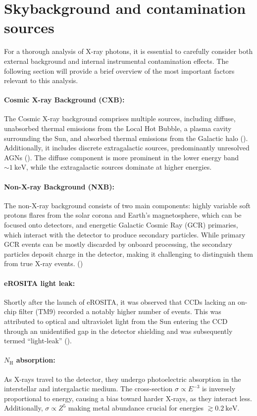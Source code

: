 %
\section{Skybackground and contamination sources}\label{sec:background}
For a thorough analysis of X-ray photons, it is essential to carefully consider both external background and internal instrumental contamination effects. The following section will provide a brief overview of the most important factors relevant to this analysis.
\paragraph*{Cosmic X-ray Background (CXB):} The Cosmic X-ray background comprises multiple sources, including diffuse, unabsorbed thermal emissions from the Local Hot Bubble, a plasma cavity surrounding the Sun, and absorbed thermal emissions from the Galactic halo (\cite{galeazzi2006xmm}). Additionally, it includes discrete extragalactic sources, predominantly unresolved AGNs  (\cite{brandt2005deep}). The diffuse component is more prominent in the lower energy band \(\sim\SI{1}{\kilo\electronvolt}\), while the extragalactic sources dominate at higher energies.
\paragraph*{Non-X-ray Background (NXB):} The non-X-ray background consists of two main components: highly variable soft protons flares from the solar corona and Earth's magnetosphere, which can be focused onto detectors, and energetic Galactic Cosmic Ray (GCR) primaries, which interact with the detector to produce secondary particles. While primary GCR events can be mostly discarded by onboard processing, the secondary particles deposit charge in the detector, making it challenging to distinguish them from true X-ray events. (\cite{Bulbul_2020})
\paragraph*{eROSITA light leak:} Shortly after the launch of eROSITA, it was observed that CCDs lacking an on-chip filter (TM9) recorded a notably higher number of events. This was attributed to optical and ultraviolet light from the Sun entering the CCD through an unidentified gap in the detector shielding and was subsequently termed \enquote{light-leak} (\cite{Predehl2021}). 
\paragraph*{\(N_\text{H}\) absorption:} 
As X-rays travel to the detector, they undergo photoelectric absorption in the interstellar and intergalactic medium. The cross-section \(\sigma \propto E^{-3}\) is inversely proportional to energy, causing a bias toward harder X-rays, as they interact less. Additionally, \(\sigma \propto Z^5\) making metal abundance crucial for energies \(\gtrsim \SI{0.2}{\kilo\electronvolt}\).

